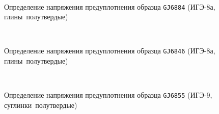     \begin{figure}
        {\centering
        \small
            \hfill 
            \\
            \hfill  
            \hfill 
        }
        \caption{Определение напряжения предуплотнения образца \texttt{GJ6884} (ИГЭ-8а, глины полутвердые)}
        \label{img:6884}
    \end{figure}
    
    \begin{figure}
        {\centering
        \small
            \hfill 
            \\
            \hfill  
            \hfill  
            }
            \caption{Определение напряжения предуплотнения образца \texttt{GJ6846} (ИГЭ-8а, глины полутвердые)}
            \label{img:6846}
    \end{figure}
    
    \begin{figure}
        {\centering
            \small
            \hfill 
            \\
            \hfill  
            \hfill  
            }
            \caption{Определение напряжения предуплотнения образца \texttt{GJ6855} (ИГЭ-9, суглинки полутвердые)}
            \label{img:6855}
    \end{figure}
    
